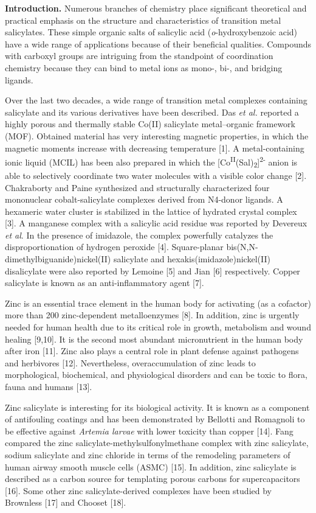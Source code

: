 \begin{multicols}{2}
{\bfseries Introduction.} Numerous branches of chemistry place significant
theoretical and practical emphasis on the structure and characteristics
of transition metal salicylates. These simple organic salts of salicylic
acid (\emph{o}-hydroxybenzoic acid) have a wide range of applications
because of their beneficial qualities. Compounds with carboxyl groups
are intriguing from the standpoint of coordination chemistry because
they can bind to metal ions as mono-, bi-, and bridging ligands.

Over the last two decades, a wide range of transition metal complexes
containing salicylate and its various derivatives have been described.
Das \emph{et al.} reported a highly porous and thermally stable Co(II)
salicylate metal--organic framework (MOF). Obtained material has very
interesting magnetic properties, in which the magnetic moments increase
with decreasing temperature {[}1{]}. A metal-containing ionic liquid
(MCIL) has been also prepared in which the
{[}Co\textsuperscript{II}(Sal)\textsubscript{2}{]}\textsuperscript{2-}
anion is able to selectively coordinate two water molecules with a
visible color change {[}2{]}. Chakraborty and Paine synthesized and
structurally characterized four mononuclear cobalt-salicylate complexes
derived from N4-donor ligands. A hexameric water cluster is stabilized
in the lattice of hydrated crystal complex {[}3{]}. A manganese complex
with a salicylic acid residue was reported by Devereux \emph{et al}. In
the presence of imidazole, the complex powerfully catalyzes the
disproportionation of hydrogen peroxide {[}4{]}. Square-planar
bis(N,N-dimethylbiguanide)nickel(II) salicylate and
hexakis(imidazole)nickel(II) disalicylate were also reported by Lemoine
{[}5{]} and Jian {[}6{]} respectively. Copper salicylate is known as an
anti-inflammatory agent {[}7{]}.

Zinc is an essential trace element in the human body for activating (as
a cofactor) more than 200 zinc-dependent metalloenzymes {[}8{]}. In
addition, zinc is urgently needed for human health due to its critical
role in growth, metabolism and wound healing {[}9,10{]}. It is the
second most abundant micronutrient in the human body after iron
{[}11{]}. Zinc also plays a central role in plant defense against
pathogens and herbivores {[}12{]}. Nevertheless, overaccumulation of
zinc leads to morphological, biochemical, and physiological disorders
and can be toxic to flora, fauna and humans {[}13{]}.

Zinc salicylate is interesting for its biological activity. It is known
as a component of antifouling coatings and has been demonstrated by
Bellotti and Romagnoli to be effective against \emph{Artemia larvae}
with lower toxicity than copper {[}14{]}. Fang compared the zinc
salicylate-methylsulfonylmethane complex with zinc salicylate, sodium
salicylate and zinc chloride in terms of the remodeling parameters of
human airway smooth muscle cells (ASMC) {[}15{]}. In addition, zinc
salicylate is described as a carbon source for templating porous carbons
for supercapacitors {[}16{]}. Some other zinc salicylate-derived
complexes have been studied by Brownless {[}17{]} and Chooset {[}18{]}.


\end{multicols}
